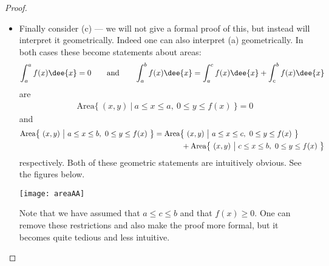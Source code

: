 \begin{proof}
\begin{itemize}
\item Finally consider (c) --- we will not give a formal proof of this, but
instead will interpret it geometrically. Indeed one can also interpret (a)
geometrically. In both cases these become statements about areas:
\begin{align*}
\int_a^a f(x)\dee{x}=0\qquad\text{and}\qquad
\int_a^b f(x)\dee{x}= \int_a^c f(x)\dee{x} + \int_c^b f(x)\dee{x}
\end{align*}
are
\begin{align*}
\text{Area}\big\{\ (x,y)\ \big|\ a\le x\le a,\ 0\le y\le f(x)\ \big\}=0
\end{align*}
and
\begin{align*}
\text{Area}\big\{\ (x,y)\ \big|\ a\le x\le b,\ 0\le y\le f(x)\ \big\}
&=\text{Area}\big\{\ (x,y)\ \big|\ a\le x\le c,\ 0\le y\le f(x)\ \big\} \\
&\hskip0.5in
+\text{Area}\big\{\ (x,y)\ \big|\ c\le x\le b,\ 0\le y\le f(x)\ \big\}
\end{align*}
respectively. Both of these geometric statements
are intuitively obvious. See the figures below.
\begin{wfig}
\begin{center}
  \texttt{[image: areaAA]}\qquad\qquad
\end{center}
\end{wfig}
Note that we have assumed that $a\leq c \leq b$ and that $f(x)\geq 0$. One can
remove
these restrictions and also make the proof more formal, but it becomes quite
tedious and
less intuitive.
\end{itemize}
\begin{comment}
For notational simplicity, let's assume that $a\le c\le b$ and $f(x)\ge 0$
for all $a\le x\le b$.
The geometric interpretations of the identities
\begin{align*}
\int_a^a f(x)\dee{x}=0\qquad\text{and}\qquad
\int_a^b f(x)\dee{x}= \int_a^c f(x)\dee{x} + \int_c^b f(x)\dee{x}
\end{align*}
are
\begin{align*}
\text{Area}\big\{\ (x,y)\ \big|\ a\le x\le a,\ 0\le y\le f(x)\ \big\}=0
\end{align*}
and
\begin{align*}
\text{Area}\big\{\ (x,y)\ \big|\ a\le x\le b,\ 0\le y\le f(x)\ \big\}
&=\text{Area}\big\{\ (x,y)\ \big|\ a\le x\le c,\ 0\le y\le f(x)\ \big\} \\
&\hskip0.5in
+\text{Area}\big\{\ (x,y)\ \big|\ c\le x\le b,\ 0\le y\le f(x)\ \big\}
\end{align*}
respectively. Both of these geometric statements
are intuitively obvious. See the figures below. We won't give a formal proof.
\begin{wfig}
\begin{center}
  \texttt{[image: areaAA]}\qquad\qquad
  \raisebox{-0.05\height}{\texttt{[image: areaABC]}}
\end{center}
\end{wfig}


\end{comment}
\end{proof}
